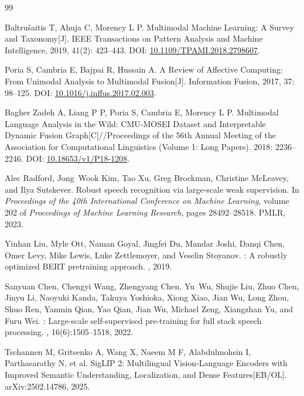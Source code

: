 {
\begin{thebibliography}{99}

 Baltru\v{s}aitis T, Ahuja C, Morency L P. Multimodal Machine Learning: A Survey and Taxonomy[J]. IEEE Transactions on Pattern Analysis and Machine Intelligence, 2019, 41(2): 423--443. DOI: \url{10.1109/TPAMI.2018.2798607}.

 Poria S, Cambria E, Bajpai R, Hussain A. A Review of Affective Computing: From Unimodal Analysis to Multimodal Fusion[J]. Information Fusion, 2017, 37: 98--125. DOI: \url{10.1016/j.inffus.2017.02.003}.

 Bagher Zadeh A, Liang P P, Poria S, Cambria E, Morency L P. Multimodal Language Analysis in the Wild: CMU-MOSEI Dataset and Interpretable Dynamic Fusion Graph[C]//Proceedings of the 56th Annual Meeting of the Association for Computational Linguistics (Volume 1: Long Papers). 2018: 2236--2246. DOI: \url{10.18653/v1/P18-1208}.

Alec Radford, Jong~Wook Kim, Tao Xu, Greg Brockman, Christine McLeavey, and
  Ilya Sutskever.
\newblock Robust speech recognition via large-scale weak supervision.
\newblock In {\em Proceedings of the 40th International Conference on Machine
  Learning}, volume 202 of {\em Proceedings of Machine Learning Research},
  pages 28492--28518. PMLR, 2023.

Yinhan Liu, Myle Ott, Naman Goyal, Jingfei Du, Mandar Joshi, Danqi Chen, Omer
  Levy, Mike Lewis, Luke Zettlemoyer, and Veselin Stoyanov.
: A robustly optimized {BERT} pretraining approach.
, 2019.

Sanyuan Chen, Chengyi Wang, Zhengyang Chen, Yu~Wu, Shujie Liu, Zhuo Chen, Jinyu
  Li, Naoyuki Kanda, Takuya Yoshioka, Xiong Xiao, Jian Wu, Long Zhou, Shuo Ren,
  Yanmin Qian, Yao Qian, Jian Wu, Michael Zeng, Xiangzhan Yu, and Furu Wei.
: Large-scale self-supervised pre-training for full stack
  speech processing.
,
  16(6):1505--1518, 2022.

Tschannen M, Gritsenko A, Wang X, Naeem M F, Alabdulmohsin I, Parthasarathy N, et al. SigLIP 2: Multilingual Vision-Language Encoders with Improved Semantic Understanding, Localization, and Dense Features[EB/OL]. arXiv:2502.14786, 2025.


\end{thebibliography}}
